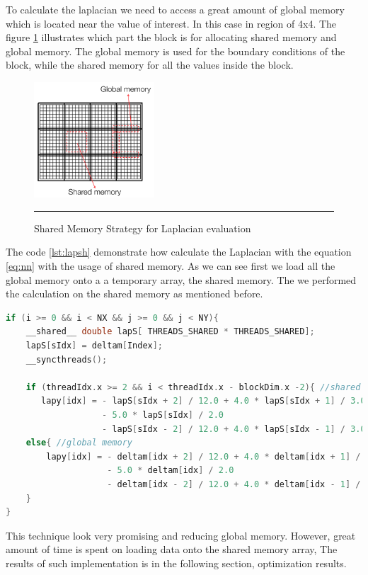 To calculate the laplacian we need to access a great amount of global memory which is located near the value of interest. In this case in region of 4x4.  The figure \ref{fig:shared} illustrates which part the block is for allocating shared memory and global memory. The global memory is used for the boundary conditions of the block, while the shared memory for all the values inside the block.

\begin{figure}[htbp]
	\centering
		\includegraphics[width=0.4\textwidth]{Figures/shared.png}
		\rule{35em}{0.2pt}
	\caption[Shared Memory Strategy]{Shared Memory Strategy for Laplacian evaluation }
	\label{fig:shared}
\end{figure}

The code \ref{lst:lapsh} demonstrate how calculate the Laplacian with the equation \ref{eq:nn} with the usage of shared memory. As we can see first we load all the global memory onto a a temporary array, the shared memory. The we performed the calculation on the shared memory as mentioned before.

\begin{lstlisting}[language=C++, label={lst:lapsh}, caption={Laplacian evaluating using shared memory with boundaries condition}]
if (i >= 0 && i < NX && j >= 0 && j < NY){
    __shared__ double lapS[ THREADS_SHARED * THREADS_SHARED];
    lapS[sIdx] = deltam[Index];
    __syncthreads();

    if (threadIdx.x >= 2 && i < threadIdx.x - blockDim.x -2){ //shared
       lapy[idx] = - lapS[sIdx + 2] / 12.0 + 4.0 * lapS[sIdx + 1] / 3.0
			  	   - 5.0 * lapS[sIdx] / 2.0
			  	   - lapS[sIdx - 2] / 12.0 + 4.0 * lapS[sIdx - 1] / 3.0;
	else{ //global memory
		lapy[idx] = - deltam[idx + 2] / 12.0 + 4.0 * deltam[idx + 1] / 3.0
			  		- 5.0 * deltam[idx] / 2.0
			  		- deltam[idx - 2] / 12.0 + 4.0 * deltam[idx - 1] / 3.0;
	}
}
\end{lstlisting}

This technique look very promising and reducing global memory. However, great amount of time is spent on loading data onto the shared memory array, The results of such implementation is in the following section, optimization results.

